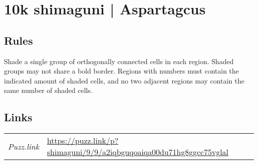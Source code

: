 \section{10k shimaguni | {\normalfont Aspartagcus}}
\label{sec:16-10k-shimaguni-aspartagcus}

\subsection*{Rules}
\begin{markdown}
Shade a single group of orthogonally connected cells in each region. Shaded groups may not share a bold border. Regions with numbers must contain the indicated amount of shaded cells, and no two adjacent regions may contain the same number of shaded cells.
\end{markdown}
\subsection*{Links}
\begin{tabularx}{\textwidth}{l X}
\emph{Puzz.link} & \url{https://puzz.link/p?shimaguni/9/9/a2iqbguqoaiqa00du71hg8ggcc75vglal} \\
\end{tabularx}
\pagebreak
